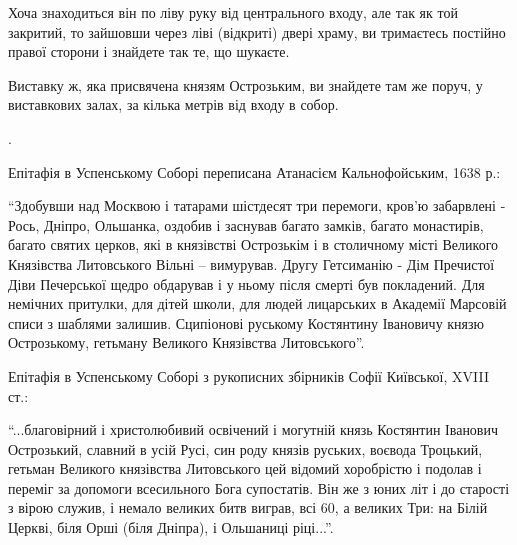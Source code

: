 Хоча знаходиться він по ліву руку від центрального входу, але так як той
закритий, то зайшовши через ліві (відкриті) двері храму, ви тримаєтесь постійно
правої сторони і знайдете так те, що шукаєте. 

Виставку ж, яка присвячена князям Острозьким, ви знайдете там же поруч, у
виставкових залах, за кілька метрів від входу в собор.

.

Епітафія в Успенському Соборі переписана Атанасієм Кальнофойським, 1638 р.:

\enquote{Здобувши над Москвою і татарами шістдесят три перемоги, кров'ю забарвлені -
Рось, Дніпро, Ольшанка, оздобив і заснував багато замків, багато монастирів,
багато святих церков, які в князівстві Острозькім і в столичному місті
Великого Князівства Литовського Вільні – вимурував. Другу Гетсиманію - Дім
Пречистої Діви Печерської щедро обдарував і у ньому після смерті був
покладений. Для немічних притулки, для дітей школи, для людей лицарських в
Академії Марсовій списи з шаблями залишив. Сципіонові руському Костянтину
Івановичу князю Острозькому, гетьману Великого Князівства Литовського}.

Епітафія в Успенському Соборі з рукописних збірників Софії Київської, XVIII
ст.:

\enquote{...благовірний і христолюбивий освічений і могутній князь Костянтин Іванович
Острозький, славний в усій Русі, син роду князів руських, воєвода Троцький,
гетьман Великого князівства Литовського цей відомий хоробрістю і подолав і
переміг за допомоги всесильного Бога супостатів. Він же з юних літ і до
старості з вірою служив, і немало великих битв виграв, всі 60, а великих Три:
на Білій Церкві, біля Орші (біля Дніпра), і Ольшаниці ріці...}.
